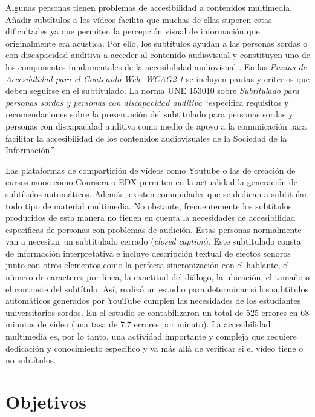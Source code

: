 \documentclass[
  12pt,
  a4paper,
  extrafontsizes,
  onecolumn,
  openright,
  table]{memoir}
\newlength{\rf}
\begin{document}
Algunas personas tienen problemas de \gls{accesibilidad} a contenidos
multimedia. Añadir subtítulos a los vídeos facilita que muchas de ellas
superen estas dificultades ya que permiten la percepción visual de
información que originalmente era acústica. Por ello, los subtítulos
ayudan a las personas sordas o con discapacidad auditiva a acceder al
contenido audiovisual y constituyen uno de los componentes fundamentales
de la accesibilidad audiovisual \autocite[ver][]{jperez1}. En las
\emph{Pautas de Accesibilidad para el Contenido Web, WCAG2.1}
\autocite[ver][]{WCAG21} se incluyen pautas y criterios que deben
seguirse en el subtitulado. La norma UNE 153010
\autocite[ver][]{aenor2012} sobre \emph{Subtitulado para personas sordas
y personas con discapacidad auditiva} \enquote{especifica requisitos y
recomendaciones sobre la presentación del subtitulado para personas
sordas y personas con discapacidad auditiva como medio de apoyo a la
comunicación para facilitar la accesibilidad de los contenidos
audiovisuales de la Sociedad de la Información.}

Las plataformas de compartición de vídeos como Youtube o las de creación
de cursos \gls{mooc} como Coursera o EDX permiten en la actualidad la
generación de subtítulos automáticos. Además, existen comunidades que se
dedican a subtitular todo tipo de material multimedia. No obstante,
frecuentemente los subtítulos producidos de esta manera no tienen en
cuenta la necesidades de accesibilidad específicas de personas con
problemas de audición. Estas personas normalmente van a necesitar un
\gls{subtitulado cerrado} (\emph{closed caption}). Este subtitulado
consta de información interpretativa e incluye descripción textual de
efectos sonoros junto con otros elementos como la perfecta
sincronización con el hablante, el número de caracteres por línea, la
exactitud del diálogo, la ubicación, el tamaño o el contraste del
subtítulo. Así, \textcite{parton2016} realizó un estudio para determinar
si los subtítulos automáticos generados por YouTube cumplen las
necesidades de los estudiantes universitarios sordos. En el estudio se
contabilizaron un total de 525 errores en 68 minutos de video (una tasa
de 7.7 errores por minuto). La accesibilidad multimedia es, por lo
tanto, una actividad importante y compleja que requiere dedicación y
conocimiento específico y va más allá de verificar si el vídeo tiene o
no subtítulos.

\hypertarget{sec-objetivos}{%
\section{Objetivos}\label{sec-objetivos}}
\end{document}
